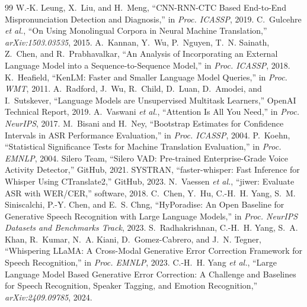 \documentclass[conference]{IEEEtran}
\begin{document}
\begin{thebibliography}{99}
 W.-K. Leung, X.~Liu, and H.~Meng, ``CNN-RNN-CTC Based End-to-End Mispronunciation Detection and Diagnosis,'' in \emph{Proc. ICASSP}, 2019.
 C.~Gulcehre \emph{et al.}, ``On Using Monolingual Corpora in Neural Machine Translation,'' \emph{arXiv:1503.03535}, 2015.
 A.~Kannan, Y.~Wu, P.~Nguyen, T.~N. Sainath, Z.~Chen, and R.~Prabhavalkar, ``An Analysis of Incorporating an External Language Model into a Sequence-to-Sequence Model,'' in \emph{Proc. ICASSP}, 2018.
 K.~Heafield, ``KenLM: Faster and Smaller Language Model Queries,'' in \emph{Proc. WMT}, 2011.
 A.~Radford, J.~Wu, R.~Child, D.~Luan, D.~Amodei, and I.~Sutskever, ``Language Models are Unsupervised Multitask Learners,'' OpenAI Technical Report, 2019.
 A.~Vaswani \emph{et al.}, ``Attention Is All You Need,'' in \emph{Proc. NeurIPS}, 2017.
 M.~Bisani and H.~Ney, ``Bootstrap Estimates for Confidence Intervals in ASR Performance Evaluation,'' in \emph{Proc. ICASSP}, 2004.
 P.~Koehn, ``Statistical Significance Tests for Machine Translation Evaluation,'' in \emph{Proc. EMNLP}, 2004.
 Silero Team, ``Silero VAD: Pre-trained Enterprise-Grade Voice Activity Detector,'' GitHub, 2021.
 SYSTRAN, ``faster-whisper: Fast Inference for Whisper Using CTranslate2,'' GitHub, 2023.
 N.~Vaessen \emph{et al.}, ``jiwer: Evaluate ASR with WER/CER,'' software, 2018.
 C.~Chen, Y.~Hu, C.-H.~H. Yang, S.~M. Siniscalchi, P.-Y. Chen, and E.~S. Chng, ``HyPoradise: An Open Baseline for Generative Speech Recognition with Large Language Models,'' in \emph{Proc. NeurIPS Datasets and Benchmarks Track}, 2023.
 S.~Radhakrishnan, C.-H.~H. Yang, S.~A. Khan, R.~Kumar, N.~A. Kiani, D.~Gomez-Cabrero, and J.~N. Tegner, ``Whispering LLaMA: A Cross-Modal Generative Error Correction Framework for Speech Recognition,'' in \emph{Proc. EMNLP}, 2023.
 C.-H.~H. Yang \emph{et al.}, ``Large Language Model Based Generative Error Correction: A Challenge and Baselines for Speech Recognition, Speaker Tagging, and Emotion Recognition,'' \emph{arXiv:2409.09785}, 2024.
\end{thebibliography}
\end{document}
